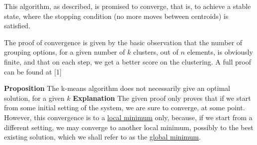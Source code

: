 \documentclass[12pt]{article}
\begin{document}
\newpage

This algorithm, as described, is promised to converge, that is, to achieve a stable state, where the stopping condition (no more moves between centroids) is satisfied.

The proof of convergence is given by the basic observation that the number of grouping options, for a given number of $k$ clusters, out of \(n \) elements, is obviously finite, and that on each step, we get a better score on the clustering.
A full proof can be found at [1] \newline

\textbf{Proposition} The k-means algorithm does not necessarily give an optimal solution, for a given $k$\newline
\textbf{Explanation} The given proof only proves that if we start from some initial setting of the system, we are sure to converge, at some point. However, this convergence is to a \underline{local minimum} only, because, if we start from a different setting, we may converge to another local minimum, possibly to the best existing solution, which we shall refer to as the \underline{global minimum}. \newline
\end{document}
